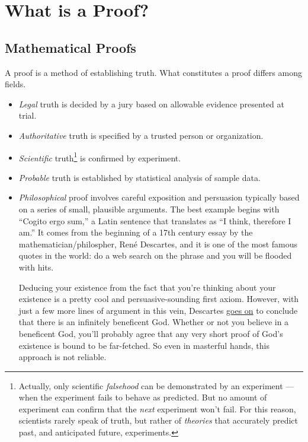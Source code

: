\chapter{What is a Proof?}\label{proofs_chap}


\section{Mathematical Proofs}

A proof is a method of establishing truth.  What constitutes a proof
differs among fields.

\begin{itemize}

\item \emph{Legal} truth is decided by a jury based on
allowable evidence presented at trial.

\item \emph{Authoritative} truth is specified by a trusted person or
organization.

\item \emph{Scientific} truth\footnote{Actually, only scientific
\emph{falsehood} can be demonstrated by an experiment ---when the experiment
fails to behave as predicted.  But no amount of experiment can confirm
that the \emph{next} experiment won't fail.  For this reason, scientists
rarely speak of truth, but rather of \emph{theories} that accurately
predict past, and anticipated future, experiments.} is confirmed by
experiment.

\item \emph{Probable} truth is established by statistical analysis of
sample data.

\item \emph{Philosophical} proof involves careful exposition and
  persuasion typically based on a series of small, plausible arguments.
  The best example begins with ``Cogito ergo sum,'' a Latin sentence that
  translates as ``I think, therefore I am.''  It comes from the beginning
  of a 17th century essay by the mathematician/philospher, Ren\'e
  Descartes, and it is one of the most famous quotes in the world: do a
  web search on the phrase and you will be flooded with hits.

  Deducing your existence from the fact that you're thinking about your
  existence is a pretty cool and persuasive-sounding first axiom.
  However, with just a few more lines of argument in this vein, Descartes
  \href{http://www.btinternet.com/~glynhughes/squashed/descartes.htm}{goes
    on} to conclude that there is an infinitely beneficent God.  Whether
  or not you believe in a beneficent God, you'll probably agree that any
  very short proof of God's existence is bound to be far-fetched.  So even
  in masterful hands, this approach is not reliable.
\end{itemize}

